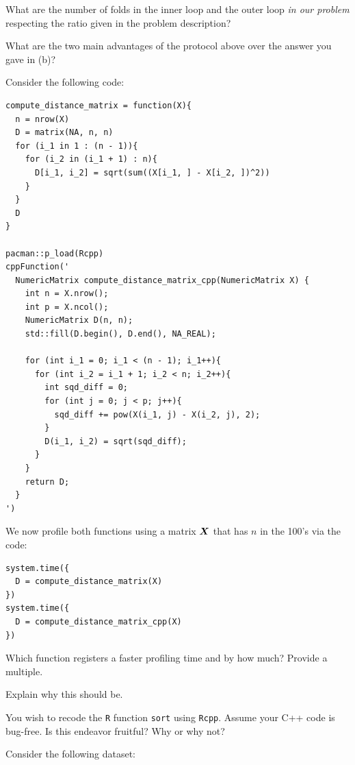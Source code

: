 \documentclass[12pt]{article}
\begin{document}
 What are the number of folds in the inner loop and the outer loop \textit{in our problem} respecting the ratio given in the problem description?

 What are the two main advantages of the protocol above over the answer you gave in (b)?




\eenum

\problem Consider the following code:

\begin{lstlisting}
compute_distance_matrix = function(X){
  n = nrow(X)
  D = matrix(NA, n, n)
  for (i_1 in 1 : (n - 1)){
    for (i_2 in (i_1 + 1) : n){
      D[i_1, i_2] = sqrt(sum((X[i_1, ] - X[i_2, ])^2))
    }
  }
  D
}

pacman::p_load(Rcpp)
cppFunction('
  NumericMatrix compute_distance_matrix_cpp(NumericMatrix X) {
    int n = X.nrow();
    int p = X.ncol();
    NumericMatrix D(n, n);
    std::fill(D.begin(), D.end(), NA_REAL);

    for (int i_1 = 0; i_1 < (n - 1); i_1++){
      for (int i_2 = i_1 + 1; i_2 < n; i_2++){
        int sqd_diff = 0;
        for (int j = 0; j < p; j++){
          sqd_diff += pow(X(i_1, j) - X(i_2, j), 2);
        }
        D(i_1, i_2) = sqrt(sqd_diff); 
      }
    }
    return D;
  }
')
\end{lstlisting}

\noindent We now profile both functions using a matrix $\boldsymbol{X}$ that has $n$ in the 100's via the code: \\

\begin{lstlisting}
system.time({
  D = compute_distance_matrix(X)
})
system.time({
  D = compute_distance_matrix_cpp(X)
})
\end{lstlisting}

\benum

 Which function registers a faster profiling time and by how much? Provide a multiple.

 Explain why this should be.

 You wish to recode the \texttt{R} function \texttt{sort} using \texttt{Rcpp}. Assume your C++ code is bug-free. Is this endeavor fruitful? Why or why not?
\eenum

\problem Consider the following dataset:
\end{document}

